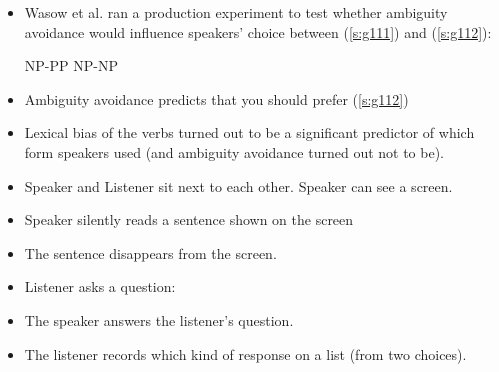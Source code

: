 \documentclass[a4paper,landscape,headrule,footrule]{foils}
\begin{document}
\begin{center}
  \begin{bchart}[max=100,step=25,unit=\%,scale=2.2]
     
     
     
     
  \end{bchart}
\end{center}

\begin{itemize}
\item Wasow et al. ran a production experiment to test 
whether ambiguity avoidance would influence 
speakers’ choice between (\ref{s:g111}) and (\ref{s:g112}): 
\begin{exe}
\ex \label{s:g111}  \hfill NP-PP
\ex \label{s:g112}  \hfill NP-NP
\end{exe}
\item Ambiguity avoidance predicts that you should prefer (\ref{s:g112})
\item Lexical bias of the verbs turned out to be a significant 
predictor of which form speakers used (and ambiguity 
avoidance turned out not to be).
\end{itemize}


\begin{itemize}
\item Speaker and Listener sit next to each other.  Speaker can see a screen.
\item Speaker silently reads a sentence shown on the screen \\ 
\item The sentence disappears from the screen.
\item Listener asks a question:
\\ 
\item The speaker answers the listener's question.
\\ 
\item The listener records which kind of response on 
a list (from two choices).
\end{itemize}
\end{document}
